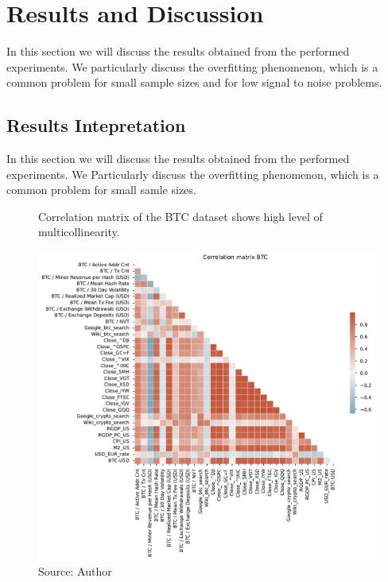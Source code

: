 \chapter{Results and Discussion}
\label{chap:five}
In this section we will discuss the results obtained from 
the performed experiments. We particularly discuss the 
overfitting phenomenon, which is a common problem
for small sample sizes and for low signal to noise problems. 


\section{Results Intepretation}
\label{sec:results}

In this section we will discuss the results obtained from 
the performed experiments. We Particularly discuss the 
overfitting phenomenon, which is a common problem
for small samle sizes. 

\begin{figure}[!h]
    \centering
    \caption{Correlation matrix of the BTC dataset shows high level of 
    multicollinearity.}
    \includegraphics[width=1\textwidth]{Figures/Corr_btc.pdf}
    \caption*{Source: Author}
    \label{fig:Corr_btc}
\end{figure}

